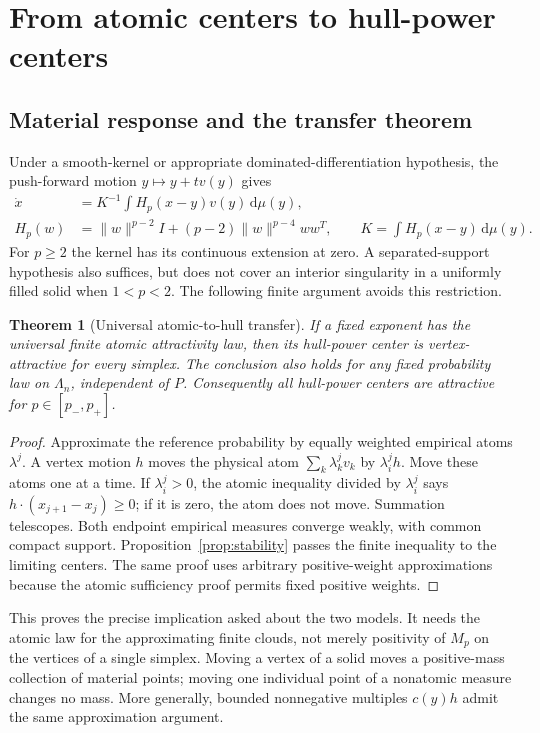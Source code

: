 \documentclass[11pt]{article}
\newtheorem{theorem}{Theorem}[section]
\theoremstyle{definition}
\newcommand{\dd}{\,\mathrm d}
\newcommand{\pn}{p_{-}}
\newcommand{\pp}{p_{+}}
\begin{document}
\section{From atomic centers to hull-power centers}
\subsection{Material response and the transfer theorem}
Under a smooth-kernel or appropriate dominated-differentiation hypothesis,
the push-forward motion $y\mapsto y+t v(y)$ gives
\begin{align}\label{eq:material}
 \dot x&=K^{-1}\int H_p(x-y)v(y)\dd\mu(y),\nonumber\\
 H_p(w)&=\|w\|^{p-2}I+(p-2)\|w\|^{p-4}ww^T,
 \qquad K=\int H_p(x-y)\dd\mu(y).
\end{align}
For $p\ge2$ the kernel has its continuous extension at zero. A
separated-support hypothesis also suffices, but does not cover an interior
singularity in a uniformly filled solid when $1<p<2$. The following finite
argument avoids this restriction.

\begin{theorem}[Universal atomic-to-hull transfer]\label{thm:transfer}
If a fixed exponent has the universal finite atomic attractivity law, then
its hull-power center is vertex-attractive for every simplex. The conclusion
also holds for any fixed probability law on $\Lambda_n$, independent of $P$.
Consequently all hull-power centers are attractive for $p\in[\pn,\pp]$.
\end{theorem}
\begin{proof}
Approximate the reference probability by equally weighted empirical atoms
$\lambda^j$. A vertex motion $h$ moves the physical atom
$\sum_k\lambda_k^j v_k$ by $\lambda_i^j h$. Move these atoms one at a time.
If $\lambda_i^j>0$, the atomic inequality divided by $\lambda_i^j$ says
$h\cdot(x_{j+1}-x_j)\ge0$; if it is zero, the atom does not move.
Summation telescopes. Both endpoint empirical measures converge weakly,
with common compact support. Proposition~\ref{prop:stability} passes the
finite inequality to the limiting centers. The same proof uses arbitrary
positive-weight approximations because the atomic sufficiency proof permits
fixed positive weights.
\end{proof}

This proves the precise implication asked about the two models. It needs the
atomic law for the approximating finite clouds, not merely positivity of
$M_p$ on the vertices of a single simplex. Moving a vertex of a solid moves
a positive-mass collection of material points; moving one individual point
of a nonatomic measure changes no mass. More generally, bounded
nonnegative multiples $c(y)h$ admit the same approximation argument.
\end{document}
